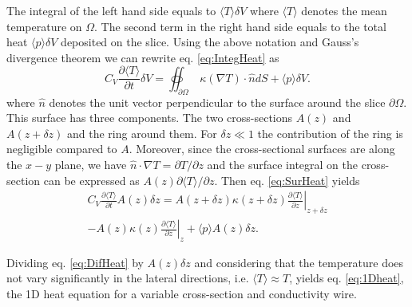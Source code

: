 \documentclass[%
 aps,
 prb,%
 amsmath,amssymb,
reprint,%
superscriptaddress,
]{revtex4-1}
\begin{document}
The integral of the left hand side equals to $\langle T \rangle \delta V$ where $\langle T \rangle$ denotes the mean temperature on $\Omega$.
The second term in the right hand side equals to the total heat $\langle p \rangle \delta V$ deposited on the slice.
Using the above notation and Gauss's divergence theorem we can rewrite eq. \eqref{eq:IntegHeat} as
\begin{equation}
	\label{eq:SurHeat}
	C_V \frac{\partial \langle T \rangle}{\partial t} \delta V = \oiint_{\partial \Omega}~\kappa (\nabla T) \cdot \hat{n}  dS + \langle p \rangle \delta V \textrm{.}
\end{equation} 
where $\hat{n}$ denotes the unit vector perpendicular to the surface around the slice $\partial \Omega$.
This surface has three components.
The two cross-sections $A(z)$ and $A(z+\delta z)$ and the ring around them.
For $\delta z \ll 1$ the contribution of the ring is negligible compared to $A$.
Moreover, since the cross-sectional surfaces are along the $x-y$ plane, we have $\hat{n}  \cdot  \nabla T = \partial T / \partial z$ and the surface integral on the cross-section can be expressed as $A(z)\partial \langle T \rangle / \partial z $. Then eq. \eqref{eq:SurHeat} yields
\begin{equation} 
	\label{eq:DifHeat}
	\begin{split}
		C_V \frac{\partial \langle T \rangle}{\partial t} A(z) \delta z = A(z+\delta z) \kappa(z+ \delta z) \left. \frac{\partial \langle T \rangle}{\partial z} \right |_{z+\delta z} \\
	 	- A(z) \kappa(z) \left. \frac{\partial \langle T \rangle}{\partial z} \right |_{z} + \langle p \rangle A(z) \delta z \textrm{.}
	\end{split}
\end{equation}

Dividing eq. \eqref{eq:DifHeat} by $A(z) \delta z$ and considering that the temperature does not vary significantly in the lateral directions, i.e. $\langle T \rangle \approx T$, yields eq. \eqref{eq:1Dheat}, the 1D heat equation for a variable cross-section and conductivity wire.
\end{document}
